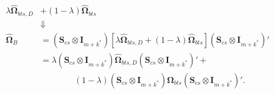 \documentclass[a4paper,11pt]{article}
\newcommand{\Ivet}{\bm{I}}
\newcommand{\Svet}{\bm{S}}
\newcommand{\Omegavet}{\bm{\Omega}}
\theoremstyle{definition}
\begin{document}
\begin{align*}
	\lambda \widehat{\Omegavet}_{bts, D} &+ (1-\lambda) \widehat{\Omegavet}_{bts}\\
	&\Downarrow\\
	\widehat{\Omegavet}_{B} & = \left(\Svet_{cs} \otimes \Ivet_{m+k^\ast}\right)\left[\lambda \widehat{\Omegavet}_{bts, D} + (1-\lambda) \widehat{\Omegavet}_{bts}\right]\left(\Svet_{cs} \otimes \Ivet_{m+k^\ast}\right)'                       \\
	                        & = \lambda \left(\Svet_{cs} \otimes \Ivet_{m+k^\ast}\right)\widehat{\Omegavet}_{bts, D}\left(\Svet_{cs} \otimes \Ivet_{m+k^\ast}\right)' +             \\
	                        & \qquad \qquad (1-\lambda) \left(\Svet_{cs} \otimes \Ivet_{m+k^\ast}\right)\widehat{\Omegavet}_{bts}\left(\Svet_{cs} \otimes \Ivet_{m+k^\ast}\right)'.
\end{align*}
\end{document}
